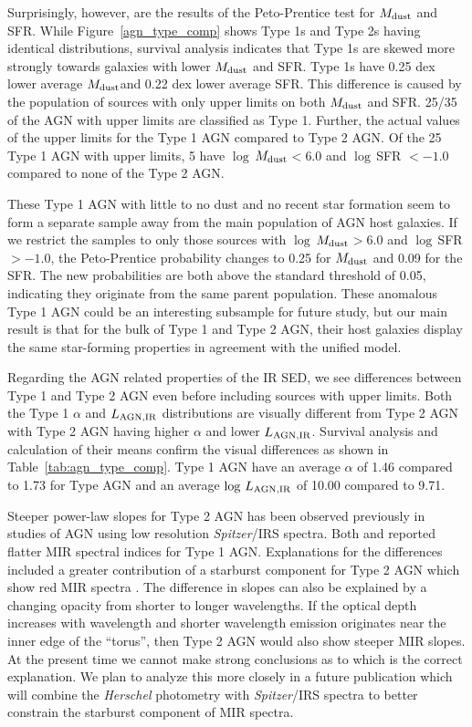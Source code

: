 \documentclass[fleqn, usenatbib]{mnras}
\newcommand{\herschel}{\emph{Herschel}}
\newcommand{\mdust}{$M_{\rm dust}$}
\begin{document}
Surprisingly, however, are the results of the Peto-Prentice test for \mdust{} and SFR. While Figure~\ref{agn_type_comp} shows Type 1s and Type 2s having identical distributions, survival analysis indicates that Type 1s are skewed more strongly towards galaxies with lower \mdust{} and SFR. Type 1s have 0.25 dex lower average \mdust and 0.22 dex lower average SFR. This difference is caused by the population of sources with only upper limits on both \mdust{} and SFR. 25/35 of the AGN with upper limits are classified as Type 1. Further, the actual values of the upper limits for the Type 1 AGN compared to Type 2 AGN. Of the 25 Type 1 AGN with upper limits, 5 have $\log\,$\mdust $< 6.0$ and $\log\,$SFR $<-1.0$ compared to none of the Type 2 AGN. 

These Type 1 AGN with little to no dust and no recent star formation seem to form a separate sample away from the main population of AGN host galaxies. If we restrict the samples to only those sources with $\log\,$\mdust $> 6.0$ and $\log\,$SFR $>-1.0$, the Peto-Prentice probability changes to 0.25 for \mdust{} and 0.09 for the SFR. The new probabilities are both above the standard threshold of 0.05, indicating they originate from the same parent population. These anomalous Type 1 AGN could be an interesting subsample for future study, but our main result is that for the bulk of Type 1 and Type 2 AGN, their host galaxies display the same star-forming properties in agreement with the unified model.

Regarding the AGN related properties of the IR SED, we see differences between Type 1 and Type 2 AGN even before including sources with upper limits. Both the Type 1 $\alpha$ and $L_{\rm AGN,IR}$ distributions are visually different from Type 2 AGN with Type 2 AGN having higher $\alpha$ and lower $L_{\rm AGN,IR}$. Survival analysis and calculation of their means confirm the visual differences as shown in Table~\ref{tab:agn_type_comp}. Type 1 AGN have an average $\alpha$ of 1.46 compared to 1.73 for Type AGN and an average $\log\,L_{\rm AGN,IR}$ of 10.00 compared to 9.71. 

Steeper power-law slopes for Type 2 AGN has been observed previously in studies of AGN using low resolution \textit{Spitzer}/IRS spectra. Both \citet{Buchanan:2006cq} and \citet{Wu:2009pt} reported flatter MIR spectral indices for Type 1 AGN. Explanations for the differences included a greater contribution of a starburst component for Type 2 AGN which show red MIR spectra \citet{Brandl:2006kx}. The difference in slopes can also be explained by a changing opacity from shorter to longer wavelengths. If the optical depth increases with wavelength and shorter wavelength emission originates near the inner edge of the ``torus'', then Type 2 AGN would also show steeper MIR slopes. At the present time we cannot make strong conclusions as to which is the correct explanation. We plan to analyze this more closely in a future publication which will combine the \herschel{} photometry with \textit{Spitzer}/IRS spectra to better constrain the starburst component of MIR spectra. 
\end{document}
